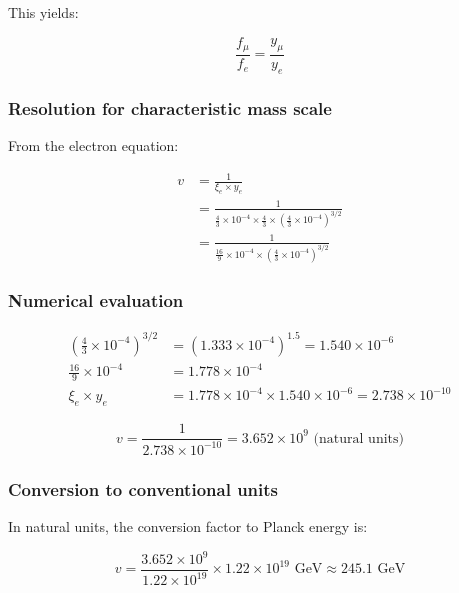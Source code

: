 \documentclass[12pt,a4paper]{article}
\begin{document}
This yields:

\begin{equation}
	\frac{f_\mu}{f_e} = \frac{y_\mu}{y_e}
\end{equation}

\subsubsection{Resolution for characteristic mass scale}

From the electron equation:

\begin{align}
	v &= \frac{1}{\xi_e \times y_e}\\
	&= \frac{1}{\frac{4}{3} \times 10^{-4} \times \frac{4}{3} \times \left(\frac{4}{3} \times 10^{-4}\right)^{3/2}}\\
	&= \frac{1}{\frac{16}{9} \times 10^{-4} \times \left(\frac{4}{3} \times 10^{-4}\right)^{3/2}}
\end{align}

\subsubsection{Numerical evaluation}

\begin{align}
	\left(\frac{4}{3} \times 10^{-4}\right)^{3/2} &= (1.333 \times 10^{-4})^{1.5} = 1.540 \times 10^{-6}\\
	\frac{16}{9} \times 10^{-4} &= 1.778 \times 10^{-4}\\
	\xi_e \times y_e &= 1.778 \times 10^{-4} \times 1.540 \times 10^{-6} = 2.738 \times 10^{-10}
\end{align}

\begin{equation}
	v = \frac{1}{2.738 \times 10^{-10}} = 3.652 \times 10^9 \text{ (natural units)}
\end{equation}

\subsubsection{Conversion to conventional units}

In natural units, the conversion factor to Planck energy is:

\begin{equation}
	v = \frac{3.652 \times 10^9}{1.22 \times 10^{19}} \times 1.22 \times 10^{19} \text{ GeV} \approx 245.1 \text{ GeV}
\end{equation}
\end{document}
